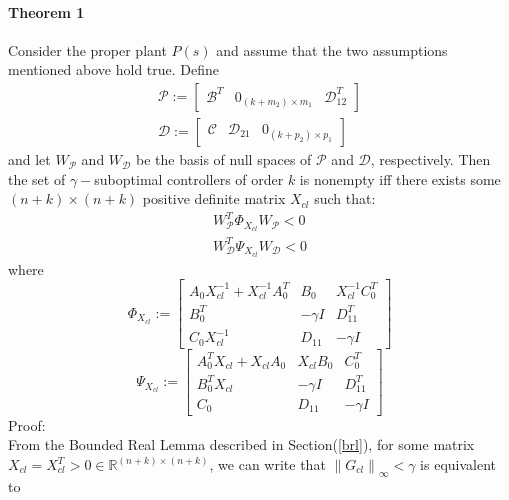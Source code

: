\documentclass[a4paper,12pt]{article}
\newcommand\norm[1]{\left\lVert#1\right\rVert}
\begin{document}
		\paragraph{Theorem 1}
		Consider the proper plant $P(s)$ and assume that the two assumptions mentioned above hold true. Define
		\begin{align}
		\label{P}
		\mathscr{P}:=
		\begin{bmatrix}
		\mathscr{B}^{T} & 0_{(k+m_{2})\times m_{1}} & \mathscr{D}_{12}^{T}
		\end{bmatrix} \\
		\label{D}
		\mathscr{D}:=
		\begin{bmatrix}
		\mathscr{C} & \mathscr{D}_{21} & 0_{(k+p_{2})\times p_{1}}
		\end{bmatrix}
		\end{align}
		and let $W_{\mathscr{P}}$ and $W_{\mathscr{D}}$ be the basis of null spaces of $\mathscr{P}$ and $\mathscr{D}$, respectively. Then the set of $\gamma-$suboptimal controllers of order $k$ is nonempty iff there exists some $(n+k) \times (n+k)$ positive definite matrix $X_{cl}$ such that:
		\begin{align}
		\label{th1eq1}
		W_{\mathscr{P}}^{T}\Phi_{X_{cl}}W_{\mathscr{P}} < 0 \\ 
		\label{th1eq2}
		W_{\mathscr{D}}^{T}\Psi_{X_{cl}}W_{\mathscr{D}} < 0
		\end{align}
		where
		\begin{equation}
		\Phi_{X_{cl}} :=
		\begin{bmatrix}
			A_{0}X_{cl}^{-1}+X_{cl}^{-1}A_{0}^{T} & B_{0} & X_{cl}^{-1}C_{0}^{T} \\
			B_{0}^{T} & -\gamma I & D_{11}^{T} \\
			C_{0}X_{cl}^{-1} & D_{11} & -\gamma I
		\end{bmatrix}
		\label{phixcl}
		\end{equation}
		\begin{equation}
		\Psi_{X_{cl}} :=
		\begin{bmatrix}
			A_{0}^{T}X_{cl}+X_{cl}A_{0} & X_{cl}B_{0} & C_{0}^{T} \\
			B_{0}^{T}X_{cl} & -\gamma I & D_{11}^{T} \\
			C_{0} & D_{11} & -\gamma I
		\end{bmatrix}
		\label{sixcl}
		\end{equation}
		Proof: \\
		From the Bounded Real Lemma described in Section(\ref{brl}), for some matrix $X_{cl} = X_{cl}^{T} > 0 \in \mathbb{R}^{(n+k) \times (n+k)}$, we can write that $\norm{G_{cl}}_{\infty} < \gamma$ is equivalent to
\end{document}
